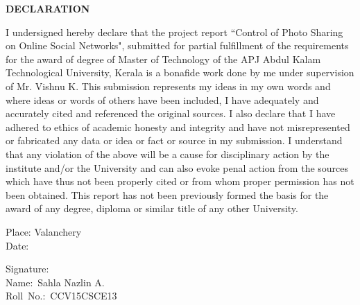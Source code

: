 \newpage
\thispagestyle{empty}


\begin{center}
\vspace*{1cm}
\large \textbf{DECLARATION}
\end{center}
\vspace*{1cm}
\begin{doublespace}
I undersigned hereby declare that the project report ``Control of Photo Sharing on Online Social Networks", submitted for
partial fulfillment of the requirements for the award of degree of Master of Technology of
the APJ Abdul Kalam Technological University, Kerala is a bonafide work done by me
under supervision of Mr. Vishnu K. This submission represents my ideas in
my own words and where ideas or words of others have been included, I have adequately
and accurately cited and referenced the original sources. I also declare that I have
adhered to ethics of academic honesty and integrity and have not misrepresented or
fabricated any data or idea or fact or source in my submission. I understand that any
violation of the above will be a cause for disciplinary action by the institute and/or the
University and can also evoke penal action from the sources which have thus not been
properly cited or from whom proper permission has not been obtained. This report has
not been previously formed the basis for the award of any degree, diploma or similar title
of any other University.
 \end{doublespace}

\vspace{1cm}
\noindent
\begin{minipage}[t]{0.6\linewidth}
 \begin{flushleft}
  \begin{singlespace}
Place: Valanchery \\
Date: \\
 \end{singlespace}
 \end{flushleft}
 \end{minipage}
 \hfill
 \noindent
 \begin{minipage}[t]{0.6\linewidth}
 \begin{flushleft}
  \begin{singlespace}
Signature\hspace{.2cm}:\\
Name\hspace{0.9cm}:~Sahla Nazlin A. \\
Roll~No.\hspace{0.4cm}:~CCV15CSCE13
 \end{singlespace}
\end{flushleft}
\end{minipage}








